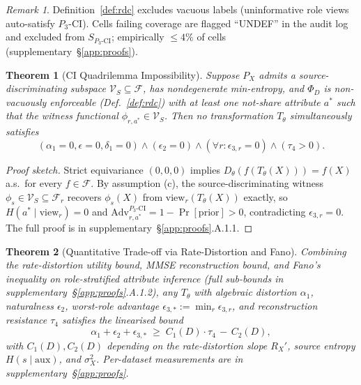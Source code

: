 \documentclass{article}
\newtheorem{theorem}{Theorem}
\theoremstyle{remark}
\newtheorem*{remark}{Remark}
\newcommand{\Adv}{\mathrm{Adv}}
\newcommand{\view}{\mathrm{view}}
\newcommand{\PCI}{P_3\text{-CI}}
\newcommand{\SCI}{S_{P_3\text{-CI}}}
\begin{document}
\begin{remark}
Definition~\ref{def:rdc} excludes vacuous labels (uninformative role views auto-satisfy $\PCI$). Cells failing coverage are flagged ``UNDEF'' in the audit log and excluded from $\SCI$; empirically $\le 4\%$ of cells (supplementary~\S\ref{app:proofs}).
\end{remark}

\begin{theorem}[CI Quadrilemma Impossibility]
\label{thm:impossibility}
Suppose $P_X$ admits a source-discriminating subspace $\mathcal{V}_S \subseteq \mathcal{F}$, has nondegenerate min-entropy, and $\Phi_D$ is non-vacuously enforceable (Def.~\ref{def:rdc}) with at least one not-share attribute $a^*$ such that the witness functional $\phi_{r,a^*} \in \mathcal{V}_S$. Then no transformation $T_\theta$ simultaneously satisfies
\[
(\alpha_1 = 0, \epsilon = 0, \delta_1 = 0) \wedge (\epsilon_2 = 0) \wedge (\forall r: \epsilon_{3,r} = 0) \wedge (\tau_4 > 0).
\]
\end{theorem}

\begin{proof}[Proof sketch]
Strict equivariance $(0,0,0)$ implies $D_\theta(f(T_\theta(X))) = f(X)$ a.s.\ for every $f \in \mathcal{F}$. By assumption (c), the source-discriminating witness $\phi_s \in \mathcal{V}_S \subseteq \mathcal{F}_r$ recovers $\phi_s(X)$ from $\view_r(T_\theta(X))$ exactly, so $H(a^* \mid \view_r) = 0$ and $\Adv^{\PCI}_{r,a^*} = 1 - \Pr[\text{prior}] > 0$, contradicting $\epsilon_{3,r} = 0$. The full proof is in supplementary~\S\ref{app:proofs}.A.1.1. \qedhere
\end{proof}

\begin{theorem}[Quantitative Trade-off via Rate-Distortion and Fano]
\label{thm:tradeoff}
Combining the rate-distortion utility bound, MMSE reconstruction bound, and Fano's inequality on role-stratified attribute inference (full sub-bounds in supplementary~\S\ref{app:proofs}.A.1.2), any $T_\theta$ with algebraic distortion $\alpha_1$, naturalness $\epsilon_2$, worst-role advantage $\epsilon_{3,*} := \min_r \epsilon_{3,r}$, and reconstruction resistance $\tau_4$ satisfies the linearised bound
\[
\alpha_1 + \epsilon_2 + \epsilon_{3,*} \;\ge\; C_1(D) \cdot \tau_4 \,-\, C_2(D),
\]
with $C_1(D), C_2(D)$ depending on the rate-distortion slope $R_X'$, source entropy $H(s\mid\mathrm{aux})$, and $\sigma_X^2$. Per-dataset measurements are in supplementary~\S\ref{app:proofs}.
\end{theorem}
\end{document}
